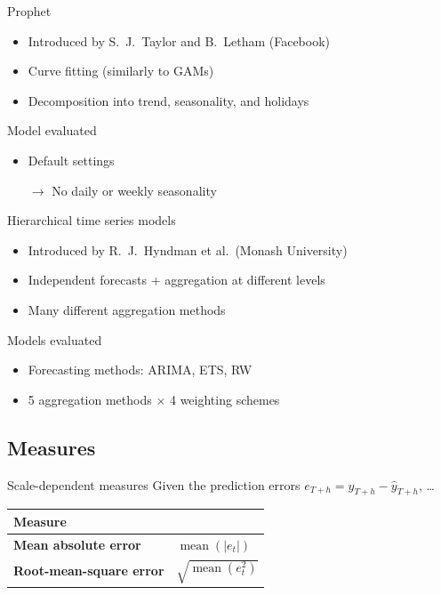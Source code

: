 \documentclass[12pt,aspectratio=169]{beamer}
\begin{document}
\begin{frame}{Prophet}
    \begin{itemize}
        \item Introduced by S.\ J.\ Taylor​​ and B.\ Letham​ (Facebook)
        \item Curve fitting (similarly to GAMs)
        \item Decomposition into trend, seasonality, and holidays
    \end{itemize}
    \vfill
    \begin{block}{Model evaluated}
        \begin{itemize}
            \item Default settings
            \item[$\rightarrow$] No daily or weekly seasonality
        \end{itemize}
    \end{block}
\end{frame}

\begin{frame}{Hierarchical time series models}
    \begin{itemize}
        \item Introduced by R.\ J.\ Hyndman et al.\ (Monash University)
        \item Independent forecasts + aggregation at different levels
        \item Many different aggregation methods
    \end{itemize}
    \vfill
    \begin{block}{Models evaluated}
        \begin{itemize}
            \item Forecasting methods: ARIMA, ETS, RW
            \item 5 aggregation methods $\times$ 4 weighting schemes
        \end{itemize}
    \end{block}
\end{frame}

\subsection{Measures}

\begin{frame}{Scale-dependent measures}
    Given the prediction errors $e_{T + h} = y_{T + h} - \hat{y}_{T + h}$, \ldots
    \begin{center}
        \renewcommand{\arraystretch}{1.5}%
        \begin{tabular}{ll}
            \toprule
            \textbf{Measure} & \\
            \midrule
            \textbf{Mean absolute error}              & $\operatorname{mean}(|e_{t}|)$ \\
            \textbf{Root\hyp{}mean\hyp{}square error} & $\sqrt{\operatorname{mean}(e_{t}^{2})}$ \\
            \bottomrule
        \end{tabular}
    \end{center}
\end{frame}
\end{document}

